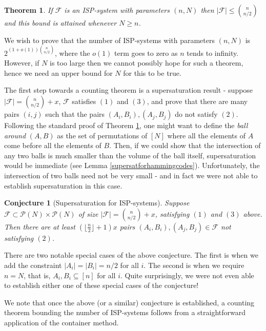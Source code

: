 \documentclass[11pt]{article}
\newtheorem{thm}[theorem]{Theorem}
\newtheorem{conj}[theorem]{Conjecture}
\numberwithin{equation}{section}
\begin{document}
\begin{thm}\label{griggsstahltrotter}
If $\mathcal{F}$ is an ISP-system with parameters $(n,N)$ then $|\mathcal{F}|\leq \binom{n}{n/2}$ and this bound is attained whenever $N\geq n$.
\end{thm}

We wish to prove that the number of ISP-systems with parameters $(n,N)$ is $2^{(1+o(1))\binom{n}{n/2}}$, where the $o(1)$ term goes to zero as $n$ tends to infinity. However, if $N$ is too large then we cannot possibly hope for such a theorem, hence we need an upper bound for $N$ for this to be true. 

The first step towards a counting theorem is a supersaturation result - suppose $|\mathcal{F}|=\binom{n}{n/2}+x$, $\mathcal{F}$ satisfies $(1)$ and $(3)$, and prove that there are many pairs $(i,j)$ such that the pairs $(A_i,B_i),(A_j,B_j)$ do not satisfy $(2)$. Following the standard proof of Theorem \ref{griggsstahltrotter}, one might want to define the \emph{ball around }$(A,B)$ as the set of permutations of $[N]$ where all the elements of $A$ come before all the elements of $B$. Then, if we could show that the intersection of any two balls is much smaller than the volume of the ball itself, supersaturation would be immediate (see Lemma \ref{supersatforhammingcodes}). Unfortunately, the intersection of two balls need not be very small - and in fact we were not able to establish supersaturation in this case.


\begin{conj}[\label{falseconjbollobas1}Supersaturation for ISP-systems]
Suppose $\mathcal{F}\subset \mathcal{P}(N)\times \mathcal{P}(N)$ of size $|\mathcal{F}|=\binom{n}{n/2}+x$, satisfying $(1)$ and $(3)$ above. Then there are at least $\left(\lfloor\frac{n}{2}\rfloor+1\right)x$ pairs $(A_i,B_i),(A_j,B_j)\in\mathcal{F}$ not satisfying $(2)$. 
\end{conj}


There are two notable special cases of the above conjecture. The first is when we add the constraint $|A_i|=|B_i|=n/2$ for all $i$. The second is when we require $n=N$, that is, $A_i,B_i\subseteq [n]$ for all $i$. Quite surprisingly, we were not even able to establish either one of these special cases of the conjecture!




We note that once the above (or a similar) conjecture is established, a counting theorem bounding the number of ISP-systems follows from a straightforward application of the container method.
\end{document}
